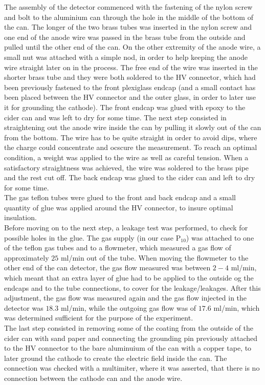 The assembly of the detector commenced with the fastening of the nylon screw and bolt to the aluminium can through the hole in the middle of the bottom of the can. The longer of the two brass tubes was inserted in the nylon screw and one end of the anode wire was passed in the brass tube from the outside and pulled until the other end of the can. On the other extremity of the anode wire, a small nut was attached with a simple nod, in order to help keeping the anode wire straight later on in the process. The free end of the wire was inserted in the shorter brass tube and they were both soldered to the HV connector, which had been previously fastened to the front plexiglass endcap (and a small contact has been placed between the HV connector and the outer glass, in order to later use it for grounding the cathode). The front endcap was glued with epoxy to the cider can and was left to dry for some time. The next step consisted in straightening out the anode wire inside the can by pulling it slowly out of the can from the bottom. The wire has to be quite straight in order to avoid dips, where the charge could concentrate and ocscure the measurement. To reach an optimal condition, a weight was applied to the wire as well as careful tension. When a satisfactory straightness was achieved, the wire was soldered to the brass pipe and the rest cut off. The back endcap was glued to the cider can and left to dry for some time. \\ The gas teflon tubes were glued to the front and back endcap and a small quantity of glue was applied around the HV connector, to insure optimal insulation. \\ Before moving on to the next step, a leakage test was performed, to check for possible holes in the glue. The gas supply (in our case P$_{10}$) was attached to one of the teflon gas tubes and to a flowmeter, which measured a gas flow of approximately $25$ ml/min out of the tube. When moving the flowmeter to the other end of the can detector, the gas flow measured was between $2-4$ ml/min, which meant that an extra layer of glue had to be applied to the outside og the endcaps and to the tube connections, to cover for the leakage/leakages. After this adjustment, the gas flow was measured again and the gas flow injected in the detector was $18.3$ ml/min, while the outgoing gas flow was of $17.6$ ml/min, which was determined sufficient for the purpose of the experiment. \\ The last step consisted in removing some of the coating from the outside of the cider can with sand paper and connecting the grounding pin previously attached to the HV connector to the bare aluminuium of the can with a copper tape, to later ground the cathode to create the electric field inside the can. The connection was checked with a multimiter, where it was asserted, that there is no connection between the cathode can and the anode wire.\\
